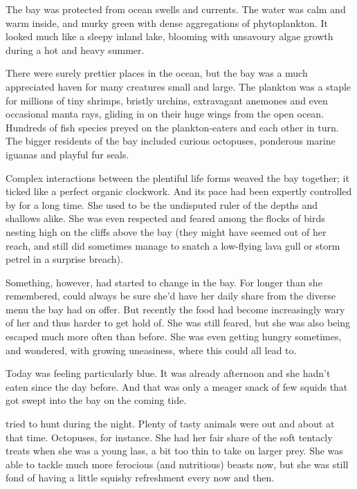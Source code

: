 The bay was protected from ocean swells and currents. The water was calm and warm inside, and murky green with dense aggregations of phytoplankton. It looked much like a sleepy inland lake, blooming with unsavoury algae growth during a hot and heavy summer. 

There were surely prettier places in the ocean, but the bay was a much appreciated haven for many creatures small and large. The plankton was a staple for millions of tiny shrimps, bristly urchins, extravagant anemones and even occasional manta rays, gliding in on their huge wings from the open ocean. Hundreds of fish species preyed on the plankton-eaters and each other in turn. The bigger residents of the bay included curious octopuses, ponderous marine iguanas and playful fur seals.

Complex interactions between the plentiful life forms weaved the bay together; it ticked like a perfect organic clockwork. And its pace had been expertly controlled by \sharknameformal for a long time. She used to be the undisputed ruler of the depths and shallows alike. She was even respected and feared among the flocks of birds nesting high on the cliffs above the bay (they might have seemed out of her reach, and still \sharknameformal did sometimes manage to snatch a low-flying lava gull or storm petrel in a surprise breach).

Something, however, had started to change in the bay. For longer than she remembered, \sharknameformal could always be sure she'd have her daily share from the diverse menu the bay had on offer. But recently the food had become increasingly wary of her and thus harder to get hold of. She was still feared, but she was also being escaped much more often than before. She was even getting hungry sometimes, and wondered, with growing uneasiness, where this could all lead to.

\mybreak

Today \sharknameformal was feeling particularly blue. It was already afternoon and she hadn't eaten since the day before. And that was only a meager snack of few squids that got swept into the bay on the coming tide. 

\sharknameformal tried to hunt during the night. Plenty of tasty animals were out and about at that time. Octopuses, for instance. She had her fair share of the soft tentacly treats when she was a young lass, a bit too thin to take on larger prey. She was able to tackle much more ferocious (and nutritious) beasts now, but she was still fond of having a little squishy refreshment every now and then.


